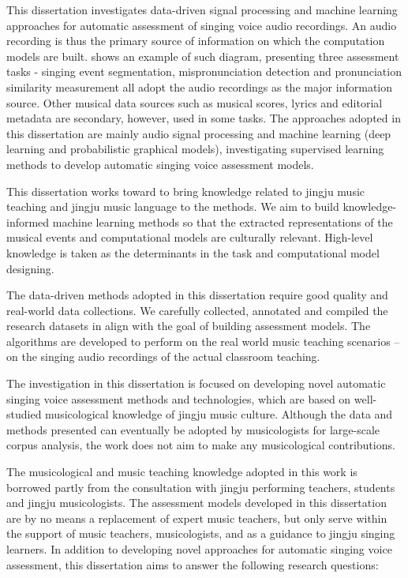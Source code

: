 This dissertation investigates data-driven signal processing and machine learning approaches for automatic assessment of singing voice audio recordings. An audio recording is thus the primary source of information on which the computation models are built.  shows an example of such diagram, presenting three assessment tasks - singing event segmentation, mispronunciation detection and pronunciation similarity measurement all adopt the audio recordings as the major information source. Other musical data sources such as musical scores, lyrics and editorial metadata are secondary, however, used in some tasks. The approaches adopted in this dissertation are mainly audio signal processing and machine learning (deep learning and probabilistic graphical models), investigating supervised learning methods to develop automatic singing voice assessment models.

This dissertation works toward to bring knowledge related to jingju music teaching and jingju music language to the methods. We aim to build knowledge-informed machine learning methods so that the extracted representations of the musical events and computational models are culturally relevant. High-level knowledge is taken as the determinants in the task and computational model designing.

The data-driven methods adopted in this dissertation require good quality and real-world data collections. We carefully collected, annotated and compiled the research datasets in align with the goal of building assessment models. The algorithms are developed to perform on the real world music teaching scenarios -- on the singing audio recordings of the actual classroom teaching.

The investigation in this dissertation is focused on developing novel automatic singing voice assessment methods and technologies, which are based on well-studied musicological knowledge of jingju music culture. Although the data and methods presented can eventually be adopted by musicologists for large-scale corpus analysis, the work does not aim to make any musicological contributions.

The musicological and music teaching knowledge adopted in this work is borrowed partly from the consultation with jingju performing teachers, students and jingju musicologists. The assessment models developed in this dissertation are by no means a replacement of expert music teachers, but only serve within the support of music teachers, musicologists, and as a guidance to jingju singing learners. In addition to developing novel approaches for automatic singing voice assessment, this dissertation aims to answer the following research questions:

